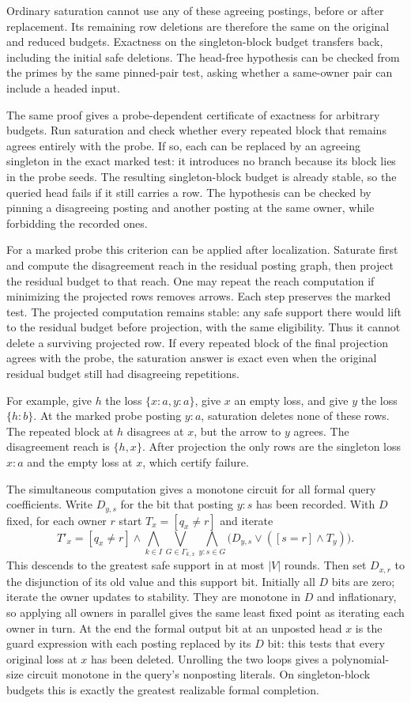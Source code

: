 Ordinary saturation cannot use any of
these agreeing postings, before or after
replacement. Its remaining row deletions
are therefore the same on the original
and reduced budgets. Exactness on the
singleton-block budget transfers back,
including the initial safe deletions.
The head-free hypothesis can be checked
from the primes by the same pinned-pair
test, asking whether a same-owner pair
can include a headed input.

The same proof gives a probe-dependent
certificate of exactness for arbitrary
budgets. Run saturation and check whether
every repeated block that remains agrees
entirely with the probe. If so, each can
be replaced by an agreeing singleton in
the exact marked test: it introduces no
branch because its block lies in the
probe seeds. The resulting singleton-block
budget is already stable, so the queried
head fails if it still carries a row. The hypothesis
can be checked by pinning a disagreeing
posting and another posting at the same
owner, while forbidding the recorded ones.

For a marked probe this criterion can be
applied after localization. Saturate first
and compute the disagreement reach in the
residual posting graph, then project the
residual budget to that reach. One may
repeat the reach computation if minimizing
the projected rows removes arrows. Each
step preserves the marked test. The
projected computation remains stable:
any safe support there would lift to
the residual budget before projection,
with the same eligibility. Thus it
cannot delete a surviving projected row.
If every repeated block of the final
projection agrees with the probe,
the saturation answer is exact even
when the original residual budget
still had disagreeing repetitions.

For example, give $h$ the loss
$\{x:a,y:a\}$, give $x$ an empty loss,
and give $y$ the loss $\{h:b\}$.
At the marked probe posting $y:a$,
saturation deletes none of these rows.
The repeated block at $h$ disagrees at
$x$, but the arrow to $y$ agrees.
The disagreement reach is $\{h,x\}$.
After projection the only rows are the
singleton loss $x:a$ and the empty
loss at $x$, which certify failure.

The simultaneous computation gives a monotone
circuit for all formal query coefficients. Write
$D_{y,s}$ for the bit that posting $y:s$ has been
recorded. With $D$ fixed, for each owner $r$ start
$T_x=[q_x\ne r]$ and iterate
\[
 T'_x=[q_x\ne r]\land
 \bigwedge_{k\in I}\bigvee_{G\in\Gamma_{k,x}}
 \bigwedge_{y:s\in G}
       \bigl(D_{y,s}\lor([s=r]\land T_y)\bigr).
\]
This descends to the greatest safe support in at
most $|V|$ rounds. Then set $D_{x,r}$ to the
disjunction of its old value and this support bit.
Initially all $D$ bits are zero; iterate the owner
updates to stability. They are monotone in $D$
and inflationary, so applying all owners in
parallel gives the same least fixed point as
iterating each owner in turn. At the end the
formal output bit at an unposted head $x$ is the guard expression
with each posting replaced by its $D$ bit: this
tests that every original loss at $x$ has been
deleted. Unrolling the two loops gives a
polynomial-size circuit monotone in the query's
nonposting literals. On singleton-block budgets
this is exactly the greatest realizable formal
completion.

